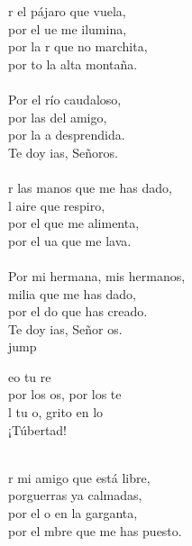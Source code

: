 \begin{cancion}%
	r el pájaro que vuela, \\
	por el ue me ilumina,\\
	por la r que no marchita, \\
	por to la alta montaña.\\
	\jump\\
Por el río caudaloso, \\
	por las  del amigo,\\
	por la a desprendida.\\
	Te doy ias, Señoros.\\
	\jump\\
	r las manos que me has dado,\\
	l aire que respiro,\\
	por el  que me alimenta, \\
	por el ua que me lava.\\
	\jump\\
Por mi hermana, mis hermanos, \\
	milia que me has dado, \\
	por el do que has creado. \\
	Te doy ias, Señor os.\\jump\\
	\begin{chorus}%
	eo tu re\\
	por los os, por los te  \\
	l tu o, grito en lo \\
	¡Túbertad! \\
	\end{chorus}%
	\jump\\
	r mi amigo que está libre, \\
	porguerras ya calmadas, \\
	por el o en la garganta, \\
	por el mbre que me has puesto. \\

\end{cancion}

